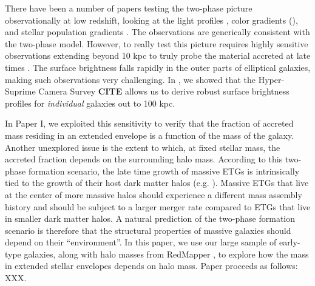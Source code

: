 \documentclass[a4paper,fleqn,usenatbib]{mnras}
\begin{document}
	There have been a number of papers testing the two-phase picture observationally at low redshift, 
    looking at the light profiles \citep{Huang2013a,Huang2013b,Oh2017}, color gradients (), 
    and stellar population gradients \citep[e.g.,][]{}. The observations are generically consistent with the 
    two-phase model. However, to really test this picture requires highly sensitive observations extending 
    beyond 10 kpc to truly probe the material accreted at late times \citep[Illustris paper here?][]{}. The surface 
    brightness falls rapidly in the outer parts of elliptical galaxies, making such observations very challenging. In 
    \citet[][; Paper I hereafter]{Huanetal2017}, we showed that the Hyper-Suprime Camera Survey {\bf CITE} allows us 
    to derive robust surface brightness profiles for {\it individual} galaxies out to 100 kpc. 
    
    In Paper I, we exploited this sensitivity to verify that the fraction of accreted mass residing in an extended
    envelope is a function of the mass of the galaxy. Another unexplored issue is the extent to which, at fixed stellar 
    mass, the accreted fraction depends on the surrounding halo mass. According to this two-phase formation 
    scenario, the late time growth of massive ETGs is intrinsically tied to the growth of their host dark matter halos 
    (e.g. \citealt{Leauthaud2012, Behroozi2013, Shankar2013}). 
    Massive ETGs that live at the center of more massive halos should experience 
    a different mass assembly history and should be subject to a larger merger rate 
    compared to ETGs that live in smaller dark matter halos. 
    A natural prediction of the two-phase formation scenario is therefore that the 
    structural properties of massive galaxies should depend on their ``environment''. In this paper, we use our 
    large sample of early-type galaxies, along with halo masses from RedMapper \citep{}, to explore how the mass in
    extended stellar envelopes depends on halo mass. 
    Paper proceeds as follows: XXX.
\end{document}
